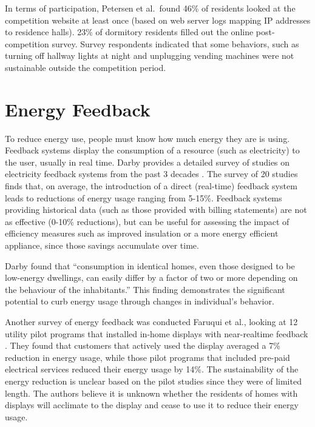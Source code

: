 In terms of participation, Petersen et al.\ found 46\% of residents looked at the competition website at least once (based on web server logs mapping IP addresses to residence halls). 23\% of dormitory residents filled out the online post-competition survey. Survey respondents indicated that some behaviors, such as turning off hallway lights at night and unplugging vending machines were not sustainable outside the competition period.


\section{Energy Feedback}
\label{sec:energy-feedback}

To reduce energy use, people must know how much energy they are is using. Feedback systems display the consumption of a resource (such as electricity) to the user, usually in real time. Darby provides a detailed survey of studies on electricity feedback systems from the past 3 decades \cite{darby-review-2006}. The survey of 20 studies finds that, on average, the introduction of a direct (real-time) feedback system leads to reductions of energy usage ranging from 5-15\%. Feedback systems providing historical data (such as those provided with billing statements) are not as effective (0-10\% reductions), but can be useful for assessing the impact of efficiency measures such as improved insulation or a more energy efficient appliance, since those savings accumulate over time.

Darby found that ``consumption in identical homes, even those designed to be low-energy dwellings, can easily differ by a factor of two or more depending on the behaviour of the inhabitants.'' This finding demonstrates the significant potential to curb energy usage through changes in individual's behavior.

Another survey of energy feedback was conducted Faruqui et al., looking at 12 utility pilot programs that installed in-home displays with near-realtime feedback \cite{Faruqui09}. They found that customers that actively used the display averaged a 7\% reduction in energy usage, while those pilot programs that included pre-paid electrical services reduced their energy usage by 14\%. The sustainability of the energy reduction is unclear based on the pilot studies since they were of limited length. The authors believe it is unknown whether the residents of homes with displays will acclimate to the display and cease to use it to reduce their energy usage.

